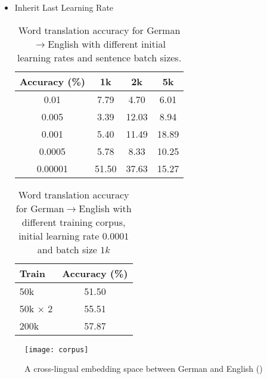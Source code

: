 \begin{itemize}
%
%		
	\item Inherit Last Learning Rate
		\begin{table}[H]
			\centering
			\begin{tabular}{cccc}
				\hline
				Accuracy (\%) & 1k   & 2k   & 5k      \\ \hline
				0.01          & 7.79  & 4.70  & 6.01 \\ \hline
				0.005       & 3.39 & 12.03 & 8.94 \\ \hline
				0.001        & 5.40 & 11.49 & 18.89 \\ \hline
				0.0005          & 5.78  & 8.33  & 10.25 \\ \hline
				0.00001        & 51.50 & 37.63 & 15.27 \\ \hline
			\end{tabular}
					\caption{Word translation accuracy for German$\rightarrow$English with different initial learning rates and sentence batch sizes. }
		\end{table}	
		\begin{table}[H]
			\centering
			\begin{tabular}{lc}
				\hline
				Train & Accuracy (\%) \\ \hline
				50k   & 51.50         \\ \hline
				50k $\times$ 2 & 55.51         \\ \hline
				200k  & 57.87         \\ \hline
			\end{tabular}
				\caption{ Word translation accuracy for German$\rightarrow$English with different training corpus, initial learning rate $0.0001$ and batch size $1k$}
		\end{table}

	

\end{itemize}

\begin{figure}[H]
	\texttt{[image: corpus]}
	\centering
	\caption{A cross-lingual embedding space between German and English (\cite{ruder2017survey})}
\end{figure}


